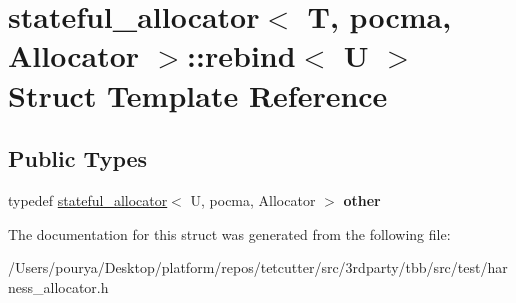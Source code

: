 \hypertarget{structstateful__allocator_1_1rebind}{}\section{stateful\+\_\+allocator$<$ T, pocma, Allocator $>$\+:\+:rebind$<$ U $>$ Struct Template Reference}
\label{structstateful__allocator_1_1rebind}
\subsection*{Public Types}
\begin{DoxyCompactItemize}
\item 
\hypertarget{structstateful__allocator_1_1rebind_a5f4f04b019c5c7b8ca406ad329a240d4}{}typedef \hyperlink{classstateful__allocator}{stateful\+\_\+allocator}$<$ U, pocma, Allocator $>$ {\bfseries other}\label{structstateful__allocator_1_1rebind_a5f4f04b019c5c7b8ca406ad329a240d4}

\end{DoxyCompactItemize}


The documentation for this struct was generated from the following file\+:\begin{DoxyCompactItemize}
\item 
/\+Users/pourya/\+Desktop/platform/repos/tetcutter/src/3rdparty/tbb/src/test/harness\+\_\+allocator.\+h\end{DoxyCompactItemize}
